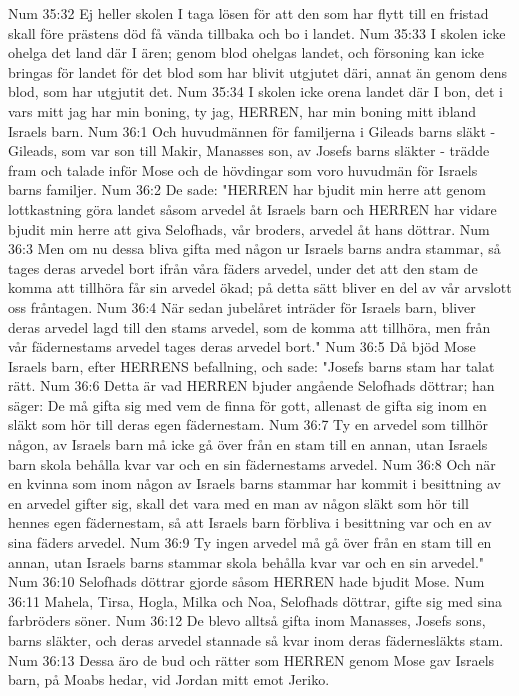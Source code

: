 Num 35:32  Ej heller skolen I taga lösen för att den som har flytt till en fristad skall före prästens död få vända tillbaka och bo i landet.
Num 35:33  I skolen icke ohelga det land där I ären; genom blod ohelgas landet, och försoning kan icke bringas för landet för det blod som har blivit utgjutet däri, annat än genom dens blod, som har utgjutit det.
Num 35:34  I skolen icke orena landet där I bon, det i vars mitt jag har min boning, ty jag, HERREN, har min boning mitt ibland Israels barn.
Num 36:1  Och huvudmännen för familjerna i Gileads barns släkt - Gileads, som var son till Makir, Manasses son, av Josefs barns släkter - trädde fram och talade inför Mose och de hövdingar som voro huvudmän för Israels barns familjer.
Num 36:2  De sade: "HERREN har bjudit min herre att genom lottkastning göra landet såsom arvedel åt Israels barn och HERREN har vidare bjudit min herre att giva Selofhads, vår broders, arvedel åt hans döttrar.
Num 36:3  Men om nu dessa bliva gifta med någon ur Israels barns andra stammar, så tages deras arvedel bort ifrån våra fäders arvedel, under det att den stam de komma att tillhöra får sin arvedel ökad; på detta sätt bliver en del av vår arvslott oss fråntagen.
Num 36:4  När sedan jubelåret inträder för Israels barn, bliver deras arvedel lagd till den stams arvedel, som de komma att tillhöra, men från vår fädernestams arvedel tages deras arvedel bort."
Num 36:5  Då bjöd Mose Israels barn, efter HERRENS befallning, och sade: "Josefs barns stam har talat rätt.
Num 36:6  Detta är vad HERREN bjuder angående Selofhads döttrar; han säger: De må gifta sig med vem de finna för gott, allenast de gifta sig inom en släkt som hör till deras egen fädernestam.
Num 36:7  Ty en arvedel som tillhör någon, av Israels barn må icke gå över från en stam till en annan, utan Israels barn skola behålla kvar var och en sin fädernestams arvedel.
Num 36:8  Och när en kvinna som inom någon av Israels barns stammar har kommit i besittning av en arvedel gifter sig, skall det vara med en man av någon släkt som hör till hennes egen fädernestam, så att Israels barn förbliva i besittning var och en av sina fäders arvedel.
Num 36:9  Ty ingen arvedel må gå över från en stam till en annan, utan Israels barns stammar skola behålla kvar var och en sin arvedel."
Num 36:10  Selofhads döttrar gjorde såsom HERREN hade bjudit Mose.
Num 36:11  Mahela, Tirsa, Hogla, Milka och Noa, Selofhads döttrar, gifte sig med sina farbröders söner.
Num 36:12  De blevo alltså gifta inom Manasses, Josefs sons, barns släkter, och deras arvedel stannade så kvar inom deras fädernesläkts stam.
Num 36:13  Dessa äro de bud och rätter som HERREN genom Mose gav Israels barn, på Moabs hedar, vid Jordan mitt emot Jeriko.


